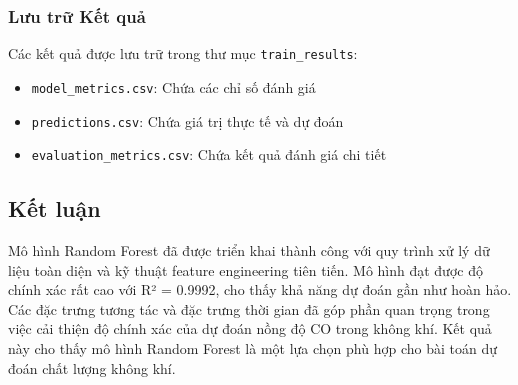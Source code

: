 \subsubsection{Lưu trữ Kết quả}
Các kết quả được lưu trữ trong thư mục \texttt{train\_results}:
\begin{itemize}
    \item \texttt{model\_metrics.csv}: Chứa các chỉ số đánh giá
    \item \texttt{predictions.csv}: Chứa giá trị thực tế và dự đoán
    \item \texttt{evaluation\_metrics.csv}: Chứa kết quả đánh giá chi tiết
\end{itemize}

\subsection{Kết luận}
Mô hình Random Forest đã được triển khai thành công với quy trình xử lý dữ liệu toàn diện và kỹ thuật feature engineering tiên tiến. Mô hình đạt được độ chính xác rất cao với R² = 0.9992, cho thấy khả năng dự đoán gần như hoàn hảo. Các đặc trưng tương tác và đặc trưng thời gian đã góp phần quan trọng trong việc cải thiện độ chính xác của dự đoán nồng độ CO trong không khí. Kết quả này cho thấy mô hình Random Forest là một lựa chọn phù hợp cho bài toán dự đoán chất lượng không khí.